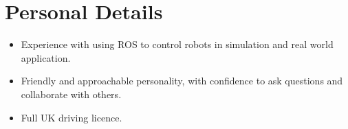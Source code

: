 \documentclass[10pt]{article}
\begin{document}
\section*{Personal Details}
\begin{itemize}[noitemsep,topsep=0pt]
    \item Experience with using ROS to control robots in simulation and real world application.
	\item Friendly and approachable personality, with confidence to ask questions and collaborate with others.
	\item Full UK driving licence.
\end{itemize}
\end{document}
